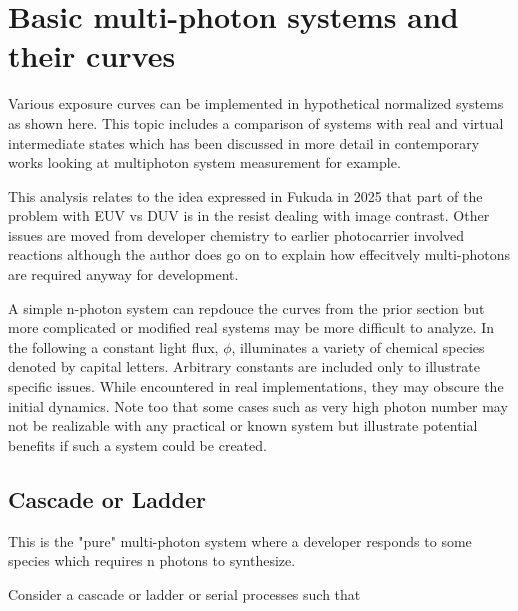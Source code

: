 \section{ Basic multi-photon systems and their curves }
Various exposure curves can be implemented in 
hypothetical normalized systems as shown here.
This topic includes a comparison of systems with real and
virtual intermediate states which has been discussed
in more detail in contemporary works looking at
multiphoton system measurement
\cite{Masthay_Beach_Eckerle_Photochemical_characterization_rate_2024}
 for example.

This analysis relates to the idea expressed in 
Fukuda in 2025 \cite{Fukuda_Statistics_exposed_2025}
that part of the problem with EUV vs DUV 
is in the resist dealing with image contrast.
Other issues are moved from developer chemistry to 
earlier photocarrier involved reactions although
the author does go on to explain how effecitvely
multi-photons are required anyway for development. 

A simple n-photon system can repdouce the curves from 
the prior section but more complicated or modified
real systems may be more difficult to analyze. 
In the following a constant light flux, $\phi$,
illuminates a variety of chemical species denoted
by capital letters. Arbitrary constants are included
only to illustrate specific issues. While encountered in 
real implementations, they may obscure the initial dynamics.
Note too that some cases such as very high photon number may
not be realizable with any practical or known system but illustrate
potential benefits if such a system could be created. 
 
\subsection{ Cascade or Ladder  }
This is the "pure" multi-photon system where a developer
responds to some species which requires n photons to synthesize.

\begin{comment} 
\cee{ 2Cu^{++}  + 4I^-  -> 2CuI +  I_2}
Once Cu(I) is formed, it can undergo underirable reacions.
\cite{SAMUNI_ARONOVITCH_GODINGER_cytotoxicity_1983}
\cee{ Cu^+ + H_2O_2  -> Cu^{++} +  OH^- +  OH }
disproportionation,
\cee{ 2Cu^+ (sq)  -> Cu^{++}(aq) +  Cu(s) }
\end{comment} 

Consider a cascade or ladder or serial processes such that

